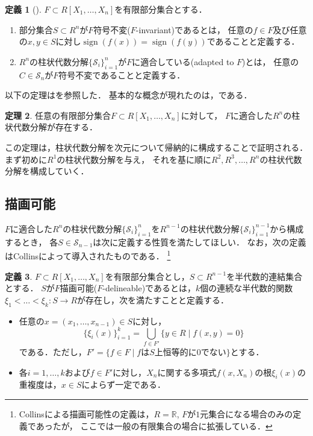 \documentclass[uplatex, dvipdfmx]{jsarticle}
\numberwithin{equation}{section}
\newcommand{\R}{\mathbb{R}}
\newcommand{\map}[3]{{#1}\colon{#2}\rightarrow{#3}}
\DeclareMathOperator{\sign}{sign}
\theoremstyle{definition}
\newtheorem{definition}{定義}[section]
\newtheorem{theorem}[definition]{定理}
\begin{document}
\begin{definition}[{\cite[Definition 5.5]{MR2248869}}]
     $F \subset R[X_1, \dots, X_n]$を有限部分集合とする．
     \begin{enumerate}
          \item 部分集合$S \subset R^n$が$F$符号不変($F$-invariant)であるとは，
          任意の$f \in F$及び任意の$x,y \in S$に対し$\sign(f(x))=\sign(f(y))$であることと定義する．

          \item $R^n$の柱状代数分解$\{\mathcal{S}_i\}_{i=1}^n$が$F$に適合している(adapted to $F$)とは，
          任意の$C \in \mathcal{S}_n$が$F$符号不変であることと定義する．
     \end{enumerate}
\end{definition}

以下の定理は\cite[Theorem 5.6]{MR2248869}を参照した．
基本的な概念が現れたのは，\cite{MR0403962}である．
\begin{theorem} \label{theorem:cad}
     任意の有限部分集合$F \subset R[X_1, \dots, X_n]$に対して，
     $F$に適合した$R^n$の柱状代数分解が存在する．
\end{theorem}

この定理は，柱状代数分解を次元について帰納的に構成することで証明される．
まず初めに$R^1$の柱状代数分解を与え，
それを基に順に$R^2, R^3, \dots, R^n$の柱状代数分解を構成していく．

\subsection{描画可能}
$F$に適合した$R^n$の柱状代数分解$\{\mathcal{S}_i\}_{i=1}^n$を$R^{n-1}$の柱状代数分解$\{\mathcal{S}_i\}_{i=1}^{n-1}$から構成するとき，
各$S \in \mathcal{S}_{n-1}$は次に定義する性質を満たしてほしい．
なお，次の定義はCollins\cite{MR0403962}によって導入されたものである．
\footnote{
     Collins\cite{MR0403962}による描画可能性の定義は，$R=\R$, $F$が$1$元集合になる場合のみの定義であったが，
     ここでは一般の有限集合の場合に拡張している．
}

\begin{definition} 
     $F \subset R[X_1, \dots, X_n]$を有限部分集合とし，$S \subset R^{n-1}$を半代数的連結集合とする．
     $S$が$F$描画可能($F$-delineable)であるとは，$k$個の連続な半代数的関数$\map{\xi_1<\dots<\xi_k}{S}{R}$が存在し，次を満たすことと定義する．
     \begin{itemize}
          \item 任意の$ x = (x_1, \dots, x_{n-1}) \in S $に対し，
          \begin{equation}
               \{\xi_i(x)\}_{i=1}^k = \bigcup_{f \in F'}\{y \in R \mid f(x,y)=0\}
          \end{equation}
          である．ただし，$F' = \{f \in F \mid \text{$f$は$S$上恒等的に$0$でない}\}$とする．
          \item 各$i=1, \dots, k$および$f \in F'$に対し，$X_n$に関する多項式$f(x,X_n)$の根$\xi_i(x)$の重複度は，$x\in S$によらず一定である．
     \end{itemize}
\end{definition}
\end{document}
